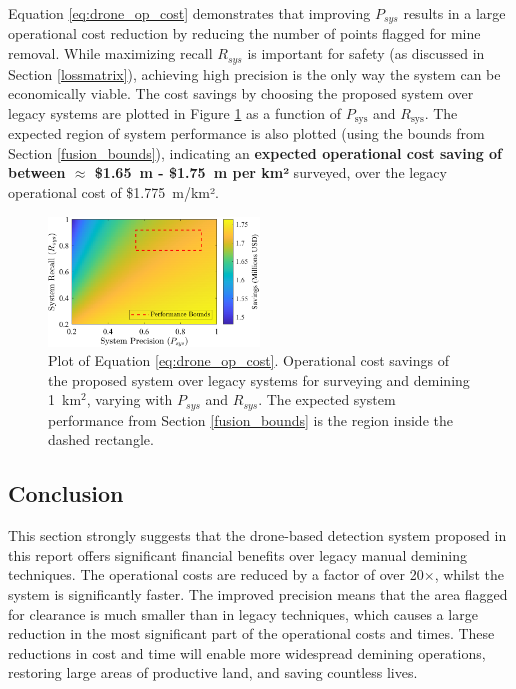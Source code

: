 Equation \ref{eq:drone_op_cost} demonstrates that improving $P_{sys}$ results in a large operational cost reduction by reducing the number of points flagged for mine removal. While maximizing recall $R_{sys}$ is important for safety (as discussed in Section \ref{lossmatrix}), achieving high precision is the only way the system can be economically viable. The cost savings by choosing the proposed system over legacy systems are plotted in Figure \ref{fig:financial_savings} as a function of $P_\text{sys}$ and $R_\text{sys}$. The expected region of system performance is also plotted (using the bounds from Section \ref{fusion_bounds}), indicating an \textbf{expected operational cost saving of between $\approx$ \$1.65~m - \$1.75~m per km²} surveyed, over the legacy operational cost of \$1.775~m/km². 


\begin{figure}[h!]
\centering
\includegraphics[width=0.5\textwidth]{figs/Rory/financial_savings.pdf} 
\caption{Plot of Equation \ref{eq:drone_op_cost}. Operational cost savings of the proposed system over legacy systems for surveying and demining 1~km$^2$, varying with $P_{sys}$ and $R_{sys}$. The expected system performance from Section \ref{fusion_bounds} is the region inside the dashed rectangle.}
\label{fig:financial_savings}
\end{figure}


\subsection{Conclusion} \label{subsec:finance_conclusion}

This section strongly suggests that the drone-based detection system proposed in this report offers significant financial benefits over legacy manual demining techniques. The operational costs are reduced by a factor of over 20$\times$, whilst the system is significantly faster. The improved precision means that the area flagged for clearance is much smaller than in legacy techniques, which causes a large reduction in the most significant part of the operational costs and times. These reductions in cost and time will enable more widespread demining operations, restoring large areas of productive land, and saving countless lives. 

